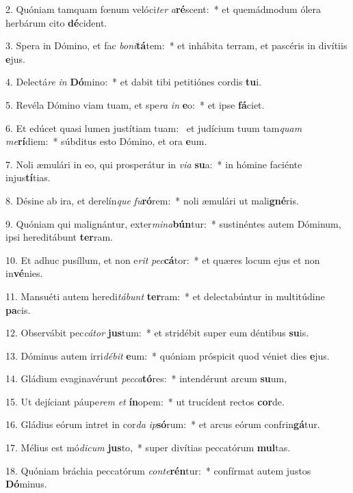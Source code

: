 2. Quóniam tamquam fœnum velóci\textit{ter} \textit{a}\textbf{ré}scent:~*  et quemádmodum ólera herbárum cito \textbf{dé}cident.\

3. Spera in Dómino, et fac \textit{bo}\textit{ni}\textbf{tá}tem:~*  et inhábita terram, et pascéris in divítiis \textbf{e}jus.\

4. Delectá\textit{re} \textit{in} \textbf{Dó}mino:~*  et dabit tibi petitiónes cordis \textbf{tu}i.\

5. Revéla Dómino viam tuam, et spe\textit{ra} \textit{in} \textbf{e}o:~*  et ipse \textbf{fá}ciet.\

6. Et edúcet quasi lumen justítiam tuam: \dag\  et judícium tuum tam\textit{quam} \textit{me}\textbf{rí}diem:~*  súbditus esto Dómino, et ora \textbf{e}um.\

7. Noli æmulári in eo, qui prosperátur in \textit{vi}\textit{a} \textbf{su}a:~*  in hómine faciénte injus\textbf{tí}tias.\

8. Désine ab ira, et derelín\textit{que} \textit{fu}\textbf{ró}rem:~*  noli æmulári ut mali\textbf{gné}ris.\

9. Quóniam qui malignántur, exter\textit{mi}\textit{na}\textbf{bún}tur:~*  sustinéntes autem Dóminum, ipsi hereditábunt \textbf{ter}ram.\

10. Et adhuc pusíllum, et non e\textit{rit} \textit{pec}\textbf{cá}tor:~*  et quæres locum ejus et non in\textbf{vé}nies.\

11. Mansuéti autem heredi\textit{tá}\textit{bunt} \textbf{ter}ram:~*  et delectabúntur in multitúdine \textbf{pa}cis.\

12. Observábit pec\textit{cá}\textit{tor} \textbf{jus}tum:~*  et stridébit super eum déntibus \textbf{su}is.\

13. Dóminus autem irri\textit{dé}\textit{bit} \textbf{e}um:~*  quóniam próspicit quod véniet dies \textbf{e}jus.\

14. Gládium evaginavérunt \textit{pec}\textit{ca}\textbf{tó}res:~*  intendérunt arcum \textbf{su}um,\

15. Ut dejíciant páupe\textit{rem} \textit{et} \textbf{ín}opem:~*  ut trucídent rectos \textbf{cor}de.\

16. Gládius eórum intret in cor\textit{da} \textit{ip}\textbf{só}rum:~*  et arcus eórum confrin\textbf{gá}tur.\

17. Mélius est mó\textit{di}\textit{cum} \textbf{jus}to,~*  super divítias peccatórum \textbf{mul}tas.\

18. Quóniam bráchia peccatórum \textit{con}\textit{te}\textbf{rén}tur:~*  confírmat autem justos \textbf{Dó}minus.\

